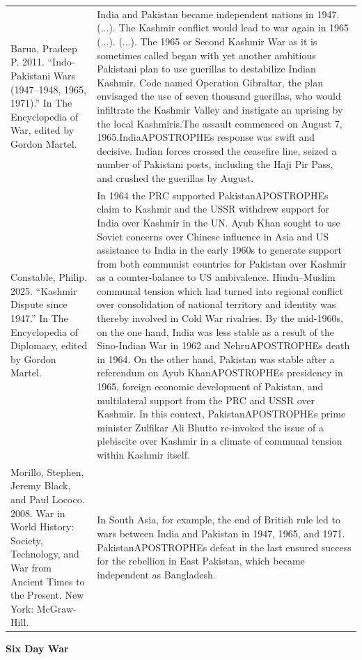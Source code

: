 {\begin{longtable}{p{}p{}}
\\
Barua, Pradeep P. 2011. “Indo-Pakistani Wars (1947–1948, 1965, 1971).” In The Encyclopedia of War, edited by Gordon Martel. & India and Pakistan became independent nations in 1947. (...). The Kashmir conflict would lead to war again in 1965 (...). (...). 
The 1965 or Second Kashmir War as it is sometimes called began with yet another ambitious Pakistani plan to use guerillas to destabilize Indian Kashmir. Code named Operation Gibraltar, the plan envisaged the use of seven thousand guerillas, who would infiltrate the Kashmir Valley and instigate an uprising by the local Kashmiris.The assault commenced on August 7, 1965.IndiaAPOSTROPHEs response was swift and decisive. Indian forces crossed the ceasefire line, seized a number of Pakistani posts, including the Haji Pir Pass, and crushed the guerillas by August.
\\
Constable, Philip. 2025. “Kashmir Dispute since 1947.” In The Encyclopedia of Diplomacy, edited by Gordon Martel. & In 1964 the PRC supported PakistanAPOSTROPHEs claim to Kashmir and the USSR withdrew support for India over Kashmir in the UN. Ayub Khan sought to use Soviet concerns over Chinese influence in Asia and US assistance to India in the early 1960s to generate support from both communist countries for Pakistan over Kashmir as a counter-balance to US ambivalence. Hindu–Muslim communal tension which had turned into regional conflict over consolidation of national territory and identity was thereby involved in Cold War rivalries. By the mid-1960s, on the one hand, India was less stable as a result of the Sino-Indian War in 1962 and NehruAPOSTROPHEs death in 1964. On the other hand, Pakistan was stable after a referendum on Ayub KhanAPOSTROPHEs presidency in 1965, foreign economic development of Pakistan, and multilateral support from the PRC and USSR over Kashmir. In this context, PakistanAPOSTROPHEs prime minister Zulfikar Ali Bhutto re-invoked the issue of a plebiscite over Kashmir in a climate of communal tension within Kashmir itself.
\\
Morillo, Stephen, Jeremy Black, and Paul Lococo. 2008. War in World History: Society, Technology, and War from Ancient Times to the Present. New York: McGraw-Hill. & In South Asia, for example, the end of British rule led to wars between India and Pakistan in 1947, 1965, and 1971. PakistanAPOSTROPHEs defeat in the last ensured success for the rebellion in East Pakistan, which became independent as Bangladesh.
\\
\end{longtable}}
\clearpage
         \textbf{Six Day War} 

